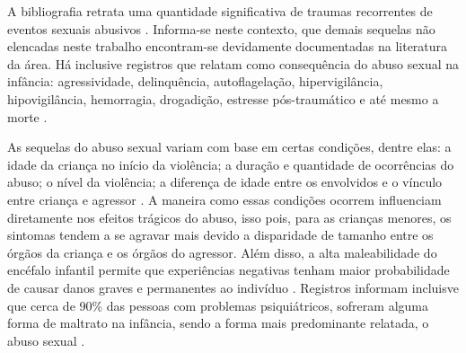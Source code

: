 \begin{parcolumns}{2}

  

\end{parcolumns}

\vspace{0.5 cm}

A bibliografia retrata uma quantidade significativa de traumas recorrentes de eventos sexuais abusivos \cite{pavao2013impasse, santos2011guia, deslandes2016atendimento, mariscal2003programa, acuna2014abuso, world2003guidelines}. Informa-se neste contexto, que demais sequelas não elencadas neste trabalho encontram-se devidamente documentadas na literatura da área. Há inclusive registros que relatam como consequência do abuso sexual na infância: agressividade, delinquência, autoflagelação, hipervigilância, hipovigilância, hemorragia, drogadição, estresse pós-traumático e até mesmo a morte \cite{meurer2017direitos}. 

As sequelas do abuso sexual variam com base em certas condições, dentre elas: a idade da criança no início da violência; a duração e quantidade de ocorrências do abuso; o nível da violência; a diferença de idade entre os envolvidos e o vínculo entre criança e agressor \cite{florentino2015possiveis}. A maneira como essas condições ocorrem influenciam diretamente nos efeitos trágicos do abuso, isso pois, para as crianças menores, os sintomas tendem a se agravar mais devido a disparidade de tamanho entre os órgãos da criança e os órgãos do agressor. Além disso, a alta maleabilidade do encéfalo infantil permite que experiências negativas tenham maior probabilidade de causar danos graves e permanentes ao indivíduo \cite{pereira2011crescimento}. Registros informam incluisve que cerca de 90\% das pessoas com problemas psiquiátricos, sofreram alguma forma de maltrato na infância, sendo a forma mais predominante relatada, o abuso sexual \cite{aded2006abuso}. %


